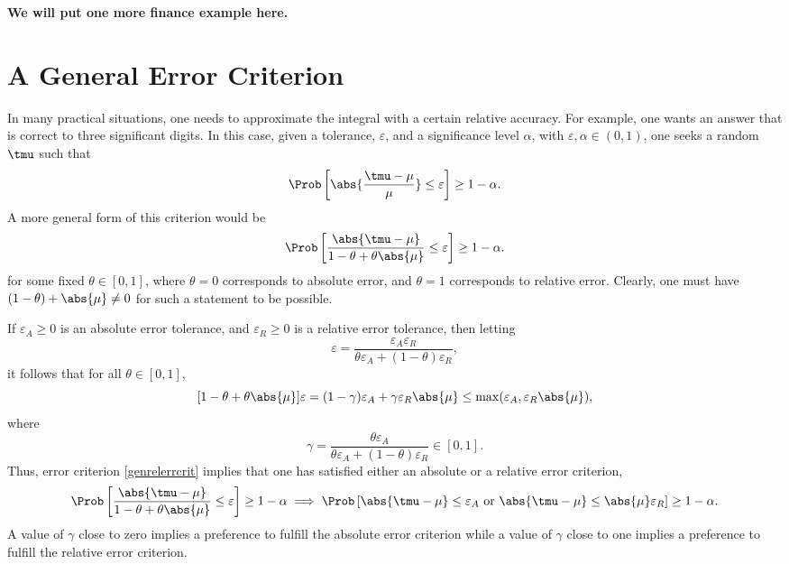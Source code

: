 \documentclass[graybox]{svmult}
\begin{document}
{\bf We will put one more finance example here.}

\section{A General Error Criterion} \label{relerrsec}

In many practical situations, one needs to approximate the integral with a certain relative accuracy.  For example, one wants an answer that is correct to three significant digits.  In this case, given a tolerance, $\varepsilon$, and a significance level $\alpha$, with $\varepsilon, \alpha \in (0, 1)$, one seeks a random $\tmu$ such that 
\begin{equation*} \label{relerrcrit}
\Prob\left[\abs{\frac{\tmu-\mu}{\mu}} \le \varepsilon \right] \geq 1-\alpha.
\end{equation*}
A more general form of this criterion would be
\begin{equation} \label{genrelerrcrit}
\Prob\left[\frac{\abs{\tmu-\mu}} {1-\theta + \theta\abs{\mu}} \le \varepsilon \right] \geq 1-\alpha.
\end{equation}
for some fixed $\theta \in [0,1]$, where $\theta=0$ corresponds to absolute error, and $\theta = 1$ corresponds to relative error.  Clearly, one must have $(1-\theta) + \abs{\mu}\ne0$ for such a statement to be possible.  

If $\varepsilon_{A} \ge 0$ is an absolute error tolerance, and $\varepsilon_{R} \ge 0$ is a relative error tolerance, then letting 
\[
\varepsilon = \frac{\varepsilon_{A}\varepsilon_{R}}{\theta \varepsilon_{A} + (1-\theta) \varepsilon_{R}},
\]
it follows that for all $\theta \in [0,1]$,
\[
[1-\theta + \theta \abs{\mu}]\varepsilon = (1-\gamma)\varepsilon_{A} + \gamma \varepsilon_{R} \abs{\mu} \le \max(\varepsilon_{A},\varepsilon_{R} \abs{\mu}),
\]
where
\[
\gamma = \frac{\theta \varepsilon_{A}}{\theta \varepsilon_{A} + (1-\theta) \varepsilon_{R}} \in [0,1].
\]
Thus, error criterion  \eqref{genrelerrcrit} implies that one has satisfied either an absolute or a relative error criterion, 
\[
\Prob\left[\frac{\abs{\tmu-\mu}} {1-\theta + \theta\abs{\mu}} \le \varepsilon \right] \geq 1-\alpha \implies \Prob\left[\abs{\tmu-\mu} \le \varepsilon_A \text{ or } \abs{\tmu-\mu} \le \abs{\mu}\varepsilon_R \right] \geq 1-\alpha.
\]
A value of $\gamma$ close to zero implies a preference to fulfill the absolute error criterion while a value of $\gamma$ close to one implies a preference to fulfill the relative error criterion.
\end{document}
